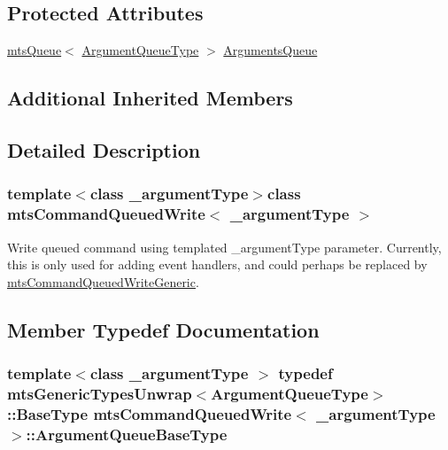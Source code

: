 \subsection*{Protected Attributes}
\begin{DoxyCompactItemize}
\item 
\hyperlink{classmts_queue}{mts\+Queue}$<$ \hyperlink{classmts_command_queued_write_a782b598b821585636a6a4f2039368b49}{Argument\+Queue\+Type} $>$ \hyperlink{classmts_command_queued_write_a863fbf2b7a850cdc9df55c9c55b5e4fd}{Arguments\+Queue}
\end{DoxyCompactItemize}
\subsection*{Additional Inherited Members}


\subsection{Detailed Description}
\subsubsection*{template$<$class \+\_\+argument\+Type$>$class mts\+Command\+Queued\+Write$<$ \+\_\+argument\+Type $>$}

Write queued command using templated \+\_\+argument\+Type parameter. Currently, this is only used for adding event handlers, and could perhaps be replaced by \hyperlink{classmts_command_queued_write_generic}{mts\+Command\+Queued\+Write\+Generic}. 

\subsection{Member Typedef Documentation}
\hypertarget{classmts_command_queued_write_a4fe3711262b382c4e23857c2e4f35979}{}
\subsubsection[{Argument\+Queue\+Base\+Type}]{\setlength{\rightskip}{0pt plus 5cm}template$<$class \+\_\+argument\+Type $>$ typedef {\bf mts\+Generic\+Types\+Unwrap}$<${\bf Argument\+Queue\+Type}$>$\+::{\bf Base\+Type} {\bf mts\+Command\+Queued\+Write}$<$ \+\_\+argument\+Type $>$\+::{\bf Argument\+Queue\+Base\+Type}}\label{classmts_command_queued_write_a4fe3711262b382c4e23857c2e4f35979}
\hypertarget{classmts_command_queued_write_a782b598b821585636a6a4f2039368b49}{}

